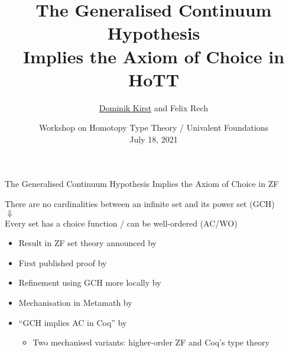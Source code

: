 \documentclass[xcolor=dvipsnames,compress,aspectratio=169,handout]{beamer}
\title[GCH Implies AC in HoTT]{The Generalised Continuum Hypothesis\\Implies the Axiom of Choice in HoTT}
\author[\underline{Dominik Kirst} and Felix Rech]{\underline{Dominik Kirst} and Felix Rech}
\date[HoTT/UF'21]{Workshop on Homotopy Type Theory / Univalent Foundations\\July 18, 2021}
\newcommand{\nologo}{\setbeamertemplate{logo}{}} %
\begin{document}
\renewcommand{\emph}[1]{\textcolor{sb@mcyan}{#1}}

\newcommand\refs[1]{%
	\begin{textblock*}{8cm}(0.3cm,9.2cm)%
		\scriptsize {\color{gray}#1}
	\end{textblock*}
}



\nologo
\begin{frame}
	\maketitle
\end{frame}

\begin{frame}{The Generalised Continuum Hypothesis Implies the Axiom of Choice in ZF}
	\begin{centering}
		\begin{widerbox}
			\center
			There are no cardinalities between an infinite set and its power set (GCH)\\
			\vspace{0.1cm}
			$\Downarrow$\\
			\vspace{0.1cm}
			Every set has a choice function / can be well-ordered (AC/WO)
		\end{widerbox}
	\end{centering}

	\vspace{0.3cm}
	\begin{itemize}
		\item
		Result in ZF set theory announced by~\cite{lindenbaum_communication_1926}
		\vspace{0.1cm}
		\item
		First published proof by~\cite{sierpinski1947}
		\vspace{0.1cm}
		\item
		Refinement using GCH more locally by~\cite{specker_verallgemeinerte_1990}
		\vspace{0.3cm}
		\item
		Mechanisation in Metamath by~\cite{carneiro_gch_2015}
		\vspace{0.1cm}
		\item
		``GCH implies AC in Coq'' by~\cite{kirst2021generalised}
		\begin{itemize}
			\item
			Two mechanised variants: higher-order ZF and Coq's type theory
		\end{itemize}
	\end{itemize}
\end{frame}
\end{document}
